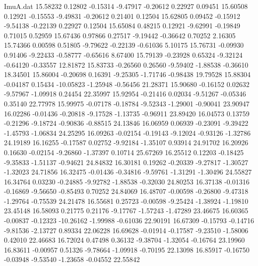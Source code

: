 \begin{filecontents}{ImuA.dat}
  15.58232    0.12802   -0.15314   -9.47917   -0.20612    0.22927    0.09451
  15.60508    0.12921   -0.15553   -9.49831   -0.20612    0.21401    0.12504
  15.62805    0.09452   -0.15912   -9.54138   -0.22139    0.22927    0.12504
  15.65084    0.48215    0.12921   -9.62991   -0.19849    0.71015    0.52959
  15.67436    0.97866    0.27517   -9.19442   -0.36642    0.70252    2.16305
  15.74366    0.00598    0.51805   -9.79622   -0.22139   -0.61036    5.10175
  15.76731   -0.09930    0.91406   -9.22433   -0.58777   -0.65616    8.67400
  15.79139   -0.23928    0.65324   -9.32124   -0.64120   -0.33557   12.81872
  15.83733   -0.26560    0.26560   -9.59402   -1.88538   -0.36610   18.34501
  15.86004   -0.20698    0.16391   -9.25305   -1.71746   -0.98438   19.79528
  15.88304   -0.04187    0.15434  -10.05823   -1.25948   -0.56456   21.28371
  15.90680   -0.16152    0.02632   -9.57967   -1.09918    0.24454   22.35997
  15.92954   -0.21416    0.02034   -9.51267   -0.05346    0.35140   22.77978
  15.99975   -0.07178   -0.18784   -9.52343   -1.29001   -0.90041   23.90947
  16.02286   -0.01436   -0.20818   -9.17528   -1.13735   -0.96911   23.89420
  16.04573    0.13759   -0.21296   -9.18724   -0.90836   -0.88515   24.13846
  16.06959    0.06939   -0.23091   -9.39422   -1.45793   -1.06834   24.25295
  16.09263   -0.02154   -0.19143   -9.12024   -0.93126   -1.32786   24.19189
  16.16255   -0.17587    0.02752   -9.92184   -1.35107    0.93914   24.91702
  16.20926    0.16630   -0.02154   -9.26860   -1.37397    0.10714   25.67269
  16.25512    0.12203   -0.18425   -9.35833   -1.51137   -0.94621   24.84832
  16.30181    0.19262   -0.20339   -9.27817   -1.30527   -1.32023   24.71856
  16.32475   -0.01436   -0.34816   -9.59761   -1.31291   -1.30496   24.55827
  16.34764    0.03230   -0.24885   -9.92782   -1.88538   -0.32030   24.80253
  16.37138   -0.01316   -0.16869   -9.56650   -0.85493    0.70252   24.84069
  16.48707   -0.00598   -0.26800   -9.47318   -1.29764   -0.75539   24.21478
  16.55681    0.25723   -0.00598   -9.25424   -1.38924   -1.19810   23.45148
  16.58093    0.21775    0.21176   -9.17767   -1.57243   -1.47289   23.46675
  16.60365   -0.00837   -0.12323  -10.26162   -1.99988   -0.61036   22.90191
  16.67309   -0.15793   -0.14716   -9.81536   -2.13727    0.89334   22.06228
  16.69628   -0.01914   -0.17587   -9.23510   -1.58006    0.42010   22.46683
  16.72024    0.47498    0.36132   -9.38704   -1.32054   -0.16764   23.19960
  16.83611   -0.00957    0.51326   -9.78664   -1.09918   -0.70195   22.13098
  16.85917   -0.16750   -0.03948   -9.53540   -1.23658   -0.04552   22.55842

\end{filecontents}
